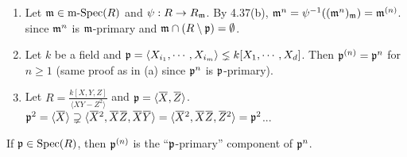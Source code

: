 \begin{example}
    \begin{enumerate}
        \item 
            Let $\mathfrak{m} \in \operatorname{m-Spec}(R)$ and $\psi: R \to R_{\mathfrak{m}}$. By 4.37(b), $\mathfrak{m}^{n} = \psi^{-1}((\mathfrak{m}^{n})_{\mathfrak{m}}) = \mathfrak{m}^{(n)}$. since $\mathfrak{m}^{n}$ is $\mathfrak{m}$-primary and $\mathfrak{m} \cap (R \setminus \mathfrak{p}) = \emptyset$.
        \item Let $k$ be a field and $\mathfrak{p} = \langle X_{i_1}, \cdots, X_{i_m} \rangle \lneq k[X_1,\cdots,X_d]$. Then $\mathfrak{p}^{(n)} = \mathfrak{p}^{n}$ for $n \geq 1$ (same proof as in (a) since $\mathfrak{p}^{n}$ is $\mathfrak{p}$-primary).
        \item Let $R = \frac{k[X,Y,Z]}{\langle XY-Z^{2} \rangle}$ and $\ffp = \langle \overbar{X}, \overbar{Z} \rangle$. $\ffp^{2} = \langle \overbar{X} \rangle \supsetneq \langle \overbar{X}^{2}, \overbar{X}\overbar{Z},\overbar{X} \overbar{Y} \rangle = \langle \overbar{X}^{2}, \overbar{X} \overbar{Z}, \overbar{Z}^{2} \rangle = \ffp^{2}$...
    \end{enumerate}
\end{example}

\begin{proposition}
    If $\mathfrak{p} \in \operatorname{Spec}(R)$, then $\mathfrak{p}^{(n)}$ is the ``$\mathfrak{p}$-primary'' component of $\mathfrak{p}^{n}$.
\end{proposition}
